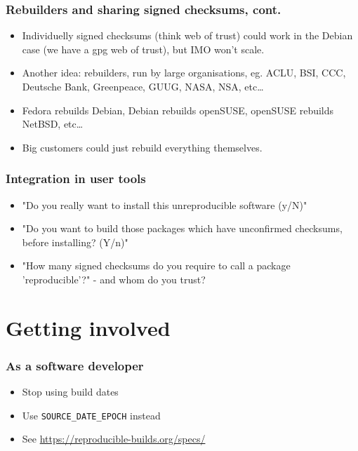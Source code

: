 \documentclass[14pt,aspectratio=169]{beamer}
\begin{document}
\begin{frame}
 \frametitle{Rebuilders and sharing signed checksums, cont.}
 \begin{itemize}
  \item Individuelly signed checksums (think web of trust) could work in the
  Debian case (we have a gpg web of trust), but IMO won't scale.
  \item { Another idea: rebuilders, run by large organisations,
  eg. ACLU, BSI, CCC, Deutsche Bank, Greenpeace, GUUG, NASA, NSA, etc…}
  \item Fedora rebuilds Debian, Debian rebuilds openSUSE, openSUSE rebuilds
  NetBSD, etc…
  \item Big customers could just rebuild everything themselves.
 \end{itemize}
\end{frame}


\begin{frame}
 \frametitle{Integration in user tools}
 \begin{itemize}
  \item "Do you really want to install this unreproducible software (y/N)"
  \item<2-3> "Do you want to build those packages which have unconfirmed checksums,
  before installing? (Y/n)"
  \item<3>{ "How many signed checksums do you require to call a package
  'reproducible'?" - and whom do you trust?}
 \end{itemize}
\end{frame}


\section{Getting involved}

\begin{frame}
 \frametitle{As a software developer}
 \begin{itemize}
  \item Stop using build dates
  \item Use \texttt{SOURCE\_DATE\_EPOCH} instead
  \item See \url{https://reproducible-builds.org/specs/}
 \end{itemize}
\end{frame}
\end{document}
